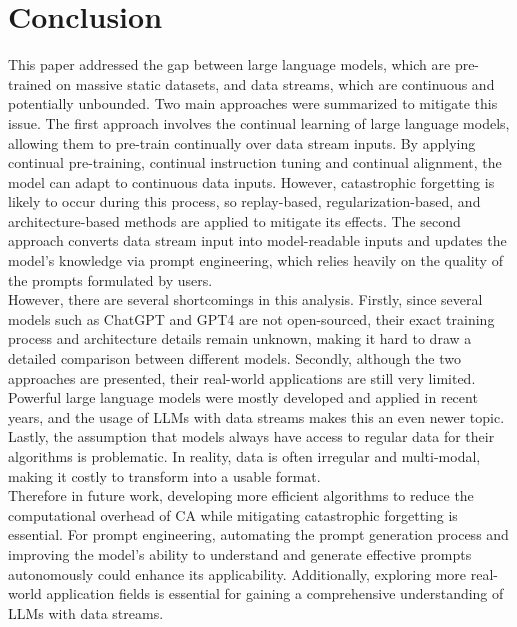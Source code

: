 \documentclass[runningheads]{llncs}
\begin{document}
\section{Conclusion}
This paper addressed the gap between large language models, which are pre-trained on massive static datasets, and data streams, which are continuous and potentially unbounded.
Two main approaches were summarized to mitigate this issue. 
The first approach involves the continual learning of large language models, allowing them to pre-train continually over data stream inputs. 
By applying continual pre-training, continual instruction tuning and continual alignment, the model can adapt to continuous data inputs.
However, catastrophic forgetting is likely to occur during this process, so replay-based, regularization-based, and architecture-based methods are applied to mitigate its effects. 
The second approach converts data stream input into model-readable inputs and updates the model's knowledge via prompt engineering, which relies heavily on the quality of the prompts formulated by users. \\
\noindent \newline
However, there are several shortcomings in this analysis. Firstly, since several models such as ChatGPT and GPT4 are not open-sourced, their exact training process and architecture details remain unknown, 
making it hard to draw a detailed comparison between different models. Secondly, although the two approaches are presented, their real-world applications are still very limited. Powerful large language models  
were mostly developed and applied in recent years, and the usage of LLMs with data streams makes this an even newer topic. Lastly, the assumption that models always have access to regular data for their algorithms is problematic. 
In reality, data is often irregular and multi-modal, making it costly to transform into a usable format. \\
\noindent \newline
Therefore in future work, 
developing more efficient algorithms to reduce the computational overhead of CA while mitigating catastrophic forgetting is essential. 
For prompt engineering, automating the prompt generation process and improving the model's ability to understand and generate effective prompts autonomously could enhance its applicability. 
Additionally, exploring more real-world application fields is essential for gaining a comprehensive understanding of LLMs with data streams.
\end{document}
